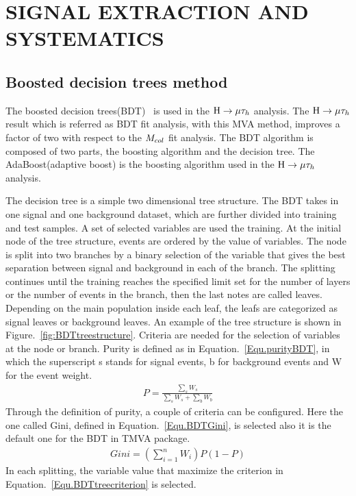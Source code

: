 
\chapter{SIGNAL EXTRACTION AND SYSTEMATICS}

\section{Boosted decision trees method} \label{BDTchaper}
The boosted decision trees(BDT)~\cite{BDTboostPI,TMVAnote} is used in the $\mathrm{H}\to \mu\tau_{h}$ analysis. The $\mathrm{H}\to \mu\tau_{h}$ result which is referred as BDT fit analysis, with this MVA method, improves a factor of two with respect to the $M_{col}$ fit analysis. The BDT algorithm is composed of two parts, the boosting algorithm and the decision tree. The AdaBoost(adaptive boost) is the boosting algorithm used in the $\mathrm{H}\to \mu\tau_{h}$ analysis. 

The decision tree is a simple two dimensional tree structure. The BDT takes in one signal and one background dataset, which are further divided into training and test samples. A set of selected variables are used the training. At the initial node of the tree structure, events are ordered by the value of variables. The node is split into two branches by a binary selection of the variable that gives the best separation between signal and background in each of the branch. The splitting continues until the training reaches the specified limit set for the number of layers or the number of events in the branch, then the last notes are called leaves. Depending on the main population inside each leaf, the leafs are categorized as signal leaves or background leaves. An example of the tree structure is shown in Figure.~\ref{fig:BDTtreestructure}.  Criteria are needed for the selection of variables at the node or branch. Purity is defined as in Equation.~\ref{Equ.purityBDT}, in which the superscript s stands for signal events, b for background events and W for the event weight.
\begin{align} \label{Equ.purityBDT}
P=\frac{\sum_{s}W_{s}}{\sum_{s}W_{s}+\sum_{b}W_{b}}
\end{align}
Through the definition of purity, a couple of criteria can be configured. Here the one called Gini, defined in Equation.~\ref{Equ.BDTGini}, is selected also it is the default one for the BDT in TMVA package. 
\begin{align}\label{Equ.BDTGini} 
Gini=(\sum_{i=1}^{n}W_{i})P(1-P)
\end{align}
In each splitting, the variable value that maximize the criterion in Equation.~\ref{Equ.BDTtreecriterion} is selected.  



